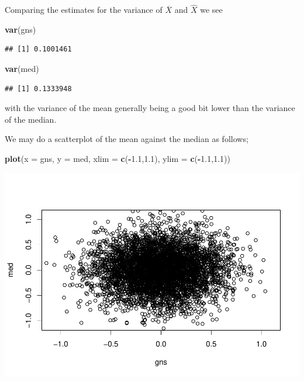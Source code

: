 \documentclass[
]{article}
\newenvironment{Shaded}{\begin{snugshade}}{\end{snugshade}}
\newcommand{\DataTypeTok}[1]{\textcolor[rgb]{0.13,0.29,0.53}{#1}}
\newcommand{\FloatTok}[1]{\textcolor[rgb]{0.00,0.00,0.81}{#1}}
\newcommand{\KeywordTok}[1]{\textcolor[rgb]{0.13,0.29,0.53}{\textbf{#1}}}
\newcommand{\NormalTok}[1]{#1}
\newcommand{\OperatorTok}[1]{\textcolor[rgb]{0.81,0.36,0.00}{\textbf{#1}}}
\begin{document}
Comparing the estimates for the variance of \(\overline{X}\) and
\(\widehat{X}\) we see

\begin{Shaded}
\begin{Highlighting}[]
\KeywordTok{var}\NormalTok{(gns)}
\end{Highlighting}
\end{Shaded}

\begin{verbatim}
## [1] 0.1001461
\end{verbatim}

\begin{Shaded}
\begin{Highlighting}[]
\KeywordTok{var}\NormalTok{(med)}
\end{Highlighting}
\end{Shaded}

\begin{verbatim}
## [1] 0.1333948
\end{verbatim}

with the variance of the mean generally being a good bit lower than the
variance of the median.

We may do a scatterplot of the mean against the median as follows;

\begin{Shaded}
\begin{Highlighting}[]
\KeywordTok{plot}\NormalTok{(}\DataTypeTok{x =}\NormalTok{ gns, }\DataTypeTok{y =}\NormalTok{ med, }\DataTypeTok{xlim =} \KeywordTok{c}\NormalTok{(}\OperatorTok{-}\FloatTok{1.1}\NormalTok{,}\FloatTok{1.1}\NormalTok{), }\DataTypeTok{ylim =} \KeywordTok{c}\NormalTok{(}\OperatorTok{-}\FloatTok{1.1}\NormalTok{,}\FloatTok{1.1}\NormalTok{))}
\end{Highlighting}
\end{Shaded}

\begin{center}\includegraphics{matstatproblems20-21_files/figure-latex/unnamed-chunk-34-1} \end{center}
\end{document}
